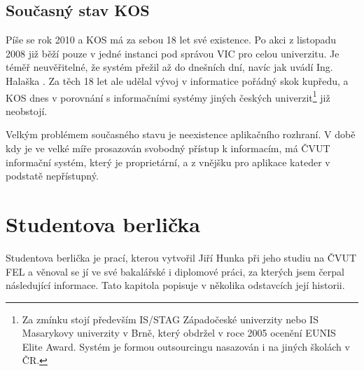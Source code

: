 \documentclass[11pt,twoside,a4paper]{book}
\begin{document}
\subsection{Současný stav KOS}
Píše se rok 2010 a KOS má za sebou 18 let své existence. Po akci  z listopadu 2008\cite{sik} již běží pouze v jedné instanci pod správou VIC pro celou univerzitu. Je téměř neuvěřitelné, že systém přežil až do dnešních dní, navíc jak uvádí Ing. Halaška\cite{student:komentar-ke-kos} \textit{}. Za těch 18 let ale udělal vývoj v informatice pořádný skok kupředu, a KOS dnes v porovnání s informačními systémy jiných českých univerzit\footnote{Za zmínku stojí především IS/STAG Západočeské univerzity nebo IS Masarykovy univerzity v Brně, který obdržel v roce 2005 ocenění EUNIS Elite Award. Systém je formou outsourcingu nasazován i na jiných školách v ČR. } již neobstojí.

Velkým problémem současného stavu je neexistence aplikačního rozhraní. V době kdy je ve velké míře prosazován svobodný přístup k informacím, má ČVUT informační systém, který je proprietární, a z vnějšku pro aplikace kateder v podstatě nepřístupný.


\section{Studentova berlička}

Studentova berlička je prací, kterou vytvořil Jiří Hunka při jeho studiu na ČVUT FEL a věnoval se jí ve své bakalářské\cite{hunka:bp} i diplomové\cite{hunka:dp} práci, za kterých jsem čerpal následující informace. Tato kapitola popisuje v několika odstavcích její historii.
\end{document}
